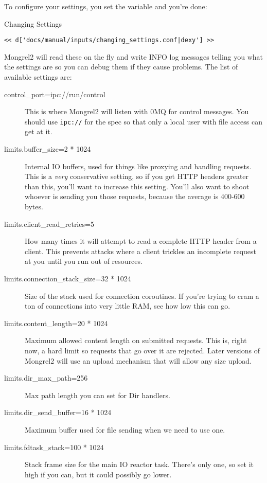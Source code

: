 To configure your settings, you set the variable  and you're done:

\begin{code}{Changing Settings}
\begin{lstlisting}
<< d['docs/manual/inputs/changing_settings.conf|dexy'] >>
\end{lstlisting}
\end{code}

Mongrel2 will read these on the fly and write INFO log messages telling you
what the settings are so you can debug them if they cause problems.  The list
of available settings are:

\begin{description}
\item[control\_port=ipc://run/control] This is where Mongrel2 will listen with 0MQ for control messages.  You should use \verb|ipc://| for the spec so that only a local user with file access can get at it.
\item[limits.buffer\_size=2 * 1024] Internal IO buffers, used for things like proxying and handling requests.  This is a \emph{very} conservative setting, so if you get HTTP headers greater than this, you'll want to increase this setting.  You'll also want to shoot whoever is sending you those requests, because the average is 400-600 bytes.
\item[limits.client\_read\_retries=5] How many times it will attempt to read a complete HTTP header from a client. This prevents attacks where a client trickles an incomplete request at you until you run out of resources.
\item[limits.connection\_stack\_size=32 * 1024] Size of the stack used for connection coroutines.  If you're trying to cram a ton of connections into very little RAM, see how low this can go.
\item[limits.content\_length=20 * 1024] Maximum allowed content length on submitted requests.  This is, right now, a hard limit so requests that go over it are rejected.  Later versions of Mongrel2 will use an upload mechanism that will allow any size upload.
\item[limits.dir\_max\_path=256] Max path length you can set for Dir handlers.
\item[limits.dir\_send\_buffer=16 * 1024] Maximum buffer used for file sending when we need to use one.
\item[limits.fdtask\_stack=100 * 1024] Stack frame size for the main IO reactor task.  There's only one, so set it high if you can, but it could possibly go lower.

\end{description}
